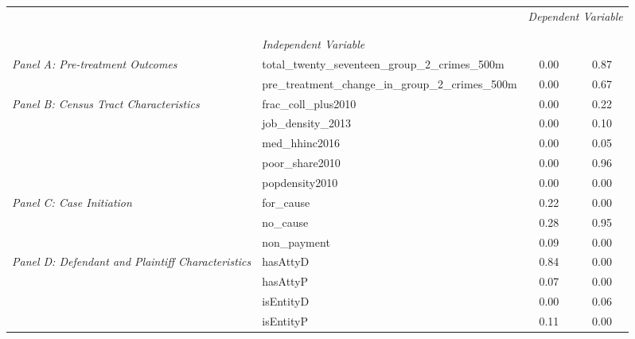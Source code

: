 \begin{tabular}{llcc}
\toprule
 &  & \multicolumn{2}{c}{\textit{Dependent Variable}} \\
\cline{3-4}
\\
 &  &  &  \\
 & \emph{Independent Variable} &  &  \\
\midrule
\multirow[c]{2}{3cm}{\textit{Panel A: Pre-treatment Outcomes}} & total_twenty_seventeen_group_2_crimes_500m & 0.00 & 0.87 \\
 & pre_treatment_change_in_group_2_crimes_500m & 0.00 & 0.67 \\
\cline{1-4}
\multirow[c]{5}{3cm}{\textit{Panel B: Census Tract Characteristics}} & frac_coll_plus2010 & 0.00 & 0.22 \\
 & job_density_2013 & 0.00 & 0.10 \\
 & med_hhinc2016 & 0.00 & 0.05 \\
 & poor_share2010 & 0.00 & 0.96 \\
 & popdensity2010 & 0.00 & 0.00 \\
\cline{1-4}
\multirow[c]{3}{3cm}{\textit{Panel C: Case Initiation}} & for_cause & 0.22 & 0.00 \\
 & no_cause & 0.28 & 0.95 \\
 & non_payment & 0.09 & 0.00 \\
\cline{1-4}
\multirow[c]{4}{3cm}{\textit{Panel D: Defendant and Plaintiff Characteristics}} & hasAttyD & 0.84 & 0.00 \\
 & hasAttyP & 0.07 & 0.00 \\
 & isEntityD & 0.00 & 0.06 \\
 & isEntityP & 0.11 & 0.00 \\
\cline{1-4}
\bottomrule
\end{tabular}
